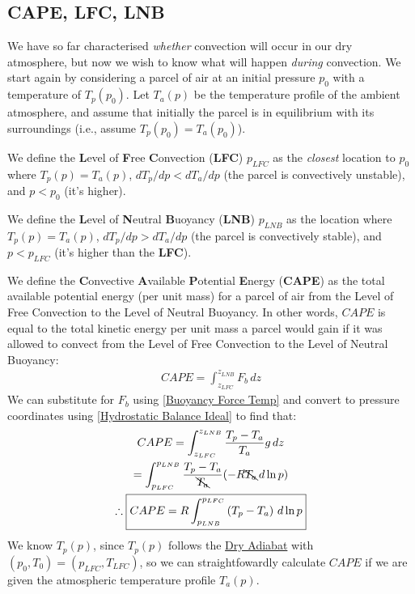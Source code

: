 \subsection{CAPE, LFC, LNB}

We have so far characterised \textit{whether} convection will occur in our dry atmosphere, but now we wish to know what will happen \textit{during} convection. We start again by considering a parcel of air at an initial pressure $p_0$ with a temperature of $T_p(p_0)$. Let $T_a(p)$ be the temperature profile of the ambient atmosphere, and assume that initially the parcel is in equilibrium with its surroundings (i.e., assume $T_p(p_0)=T_a(p_0)$).

We define the \textbf{L}evel of \textbf{F}ree \textbf{C}onvection (\textbf{LFC}) $p_{LFC}$ as the \textit{closest} location to $p_0$ where $T_p(p)=T_a(p)$, $dT_p/dp<dT_a/dp$ (the parcel is convectively unstable), and $p<p_0$ (it's higher). 

We define the \textbf{L}evel of \textbf{N}eutral \textbf{B}uoyancy (\textbf{LNB}) $p_{LNB}$ as the location where $T_p(p)=T_a(p)$, $dT_p/dp>dT_a/dp$ (the parcel is convectively stable), and $p<p_{LFC}$ (it's higher than the \textbf{LFC}).

We define the \textbf{C}onvective \textbf{A}vailable \textbf{P}otential \textbf{E}nergy (\textbf{CAPE}) as the total available potential energy (per unit mass) for a parcel of air from the Level of Free Convection to the Level of Neutral Buoyancy. In other words, $CAPE$ is equal to the total kinetic energy per unit mass a parcel would gain if it was allowed to convect from the Level of Free Convection to the Level of Neutral Buoyancy:
\begin{align}
    CAPE=\int_{z_{LFC}}^{z_{LNB}}F_b\,dz
\end{align}
We can substitute for $F_b$ using \ref{Buoyancy Force Temp} and convert to pressure coordinates using \ref{Hydrostatic Balance Ideal} to find that:
\begin{gather*}
    CAPE=\int_{z_{LFC}}^{z_{LNB}}\frac{T_p-T_a}{T_a}g\,dz\\
    =\int_{p_{LFC}}^{p_{LNB}}\frac{T_p-T_a}{\bcancel{T_a}}(-R\bcancel{T_a}\,d\ln p)\\
    \therefore \boxed{CAPE=R\int_{p_{LNB}}^{p_{LFC}}\left( T_p-T_a \right)\,d\ln p}
\end{gather*}
We know $T_p(p)$, since $T_p(p)$ follows the \hyperref[Dry Adiabat]{Dry Adiabat} with $(p_0,T_0)=(p_{LFC},T_{LFC})$, so we can straightfowardly calculate $CAPE$ if we are given the atmospheric temperature profile $T_a(p)$.

